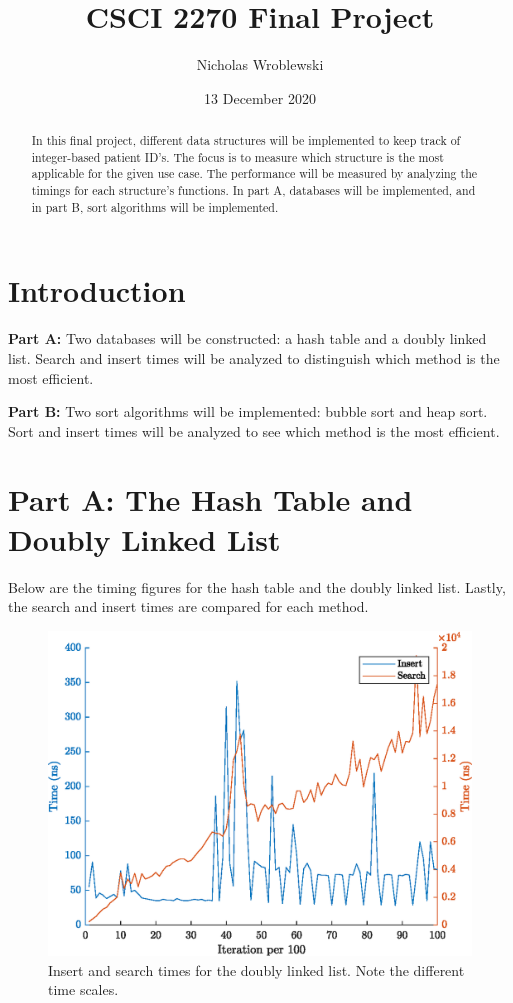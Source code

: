 \documentclass{article}
\title{CSCI 2270 Final Project}
\author{Nicholas Wroblewski}
\date{13 December 2020}
\begin{document}
\begin{titlepage}
\maketitle
\thispagestyle{empty}
\end{titlepage}

\newpage
\setcounter{page}{1}
\section*{Introduction}
    \begin{abstract}
        
        \noindent In this final project, different data structures will be implemented to keep track of integer-based patient ID's. The focus is to measure which structure is the most applicable for the given use case. The performance will be measured by analyzing the timings for each structure's functions. In part A, databases will be implemented, and in part B, sort algorithms will be implemented. 
    \end{abstract}
    
    \textbf{Part A:}
        Two databases will be constructed: a hash table and a doubly linked list. Search and insert times will be analyzed to distinguish which method is the most efficient. 
        
     \textbf{Part B:}
    Two sort algorithms will be implemented: bubble sort and heap sort. Sort and insert times will be analyzed to see which method is the most efficient. 
    
\newpage

\section*{Part A: The Hash Table and Doubly Linked List}
Below are the timing figures for the hash table and the doubly linked list. Lastly, the search and insert times are compared for each method. 

\begin{figure}[!htb]
    \centering
    \includegraphics{DLL}
    \caption{Insert and search times for the doubly linked list. Note the different time scales.}
\end{figure}
\end{document}
